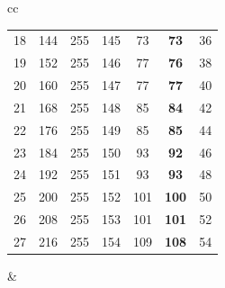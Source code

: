 \documentclass[onecolumn]{IEEEtran}
\theoremstyle{plain}
\theoremstyle{definition}
\begin{document}
\begin{table}[h!]
\begin{tabular}{cc}
\begin{tabular}[t]{c c c c c c c}
            18 & 144 & 255 & 145 & 73 & \textbf{73} & 36 \\
            19 & 152 & 255 & 146 & 77 & \textbf{76} & 38 \\
            20 & 160 & 255 & 147 & 77 & \textbf{77} & 40 \\
            21 & 168 & 255 & 148 & 85 & \textbf{84} & 42 \\
            22 & 176 & 255 & 149 & 85 & \textbf{85} & 44 \\
            23 & 184 & 255 & 150 & 93 & \textbf{92} & 46 \\
            24 & 192 & 255 & 151 & 93 & \textbf{93} & 48 \\
            25 & 200 & 255 & 152 & 101 & \textbf{100} & 50 \\
            26 & 208 & 255 & 153 & 101 & \textbf{101} & 52 \\
            27 & 216 & 255 & 154 & 109 & \textbf{108} & 54 \\
            \bottomrule
        \end{tabular} &
        

\end{tabular}
\end{table}
\end{document}
